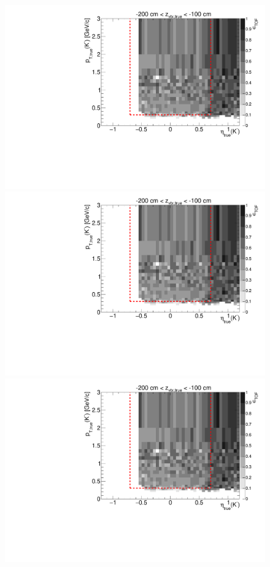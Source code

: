 \begin{figure}[hb]
{  \includegraphics[width=\linewidth,page=6]{graphics/eff/Eff2D_TOF_kaon_Minus.pdf}\\
  \includegraphics[width=\linewidth,page=8]{graphics/eff/Eff2D_TOF_kaon_Minus.pdf}\\
  \includegraphics[width=\linewidth,page=10]{graphics/eff/Eff2D_TOF_kaon_Minus.pdf}
}%
\end{figure}
